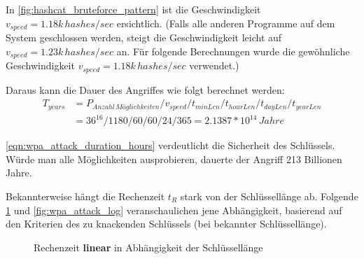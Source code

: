 In \cref{fig:hashcat_bruteforce_pattern} ist die Geschwindigkeit $v_{speed} = 1.18k\,hashes/sec$ ersichtlich.
(Falls alle anderen Programme auf dem System geschlossen werden, steigt die Geschwindigkeit leicht auf $v_{speed} = 1.23k\,hashes/sec$ an.
Für folgende Berechnungen wurde die gewöhnliche Geschwindigkeit $v_{speed} = 1.18k\,hashes/sec$ verwendet.)

Daraus kann die Dauer des Angriffes wie folgt berechnet werden:
\begin{equation}
	\begin{split}
	\label{eqn:wpa_attack_duration_hours}
	T_{years} &= P_{Anzahl\,Möglichkeiten} / v_{speed} / t_{minLen} / t_{hourLen} / t_{dayLen} / t_{yearLen}\\
	&= 36^{16} / 1180 / 60 / 60 / 24 / 365 = 2.1387 * 10^{14}\,Jahre
	\end{split}
\end{equation}

\cref{eqn:wpa_attack_duration_hours} verdeutlicht die Sicherheit des Schlüssels. Würde man alle Möglichkeiten ausprobieren, dauerte der Angriff 213 Billionen Jahre.

Bekannterweise hängt die Rechenzeit $t_R$ stark von der Schlüssellänge ab.
Folgende \cref{fig:wpa_attack_linear} und \cref{fig:wpa_attack_log} veranschaulichen jene Abhängigkeit, basierend auf den Kriterien des zu knackenden Schlüssels (bei bekannter Schlüssellänge).

\begin{figure}[H]
	\begin{minipage}[b]{.45\linewidth}
	   	\pgfplotsset{width=1.0\textwidth, height=0.7\textwidth}
		\centering
		\label{fig:1a}
	\end{minipage}%
	\begin{minipage}[b]{.45\linewidth}
		\pgfplotsset{width=1.0\textwidth, height=0.7\textwidth}
		\centering
		\label{fig:1b}
	\end{minipage}
	\caption[Rechenzeit linear in Abhängigkeit der Schlüssellänge]{Rechenzeit \textbf{linear} in Abhängigkeit der Schlüssellänge}\label{fig:1}
	\label{fig:wpa_attack_linear}
\end{figure}

